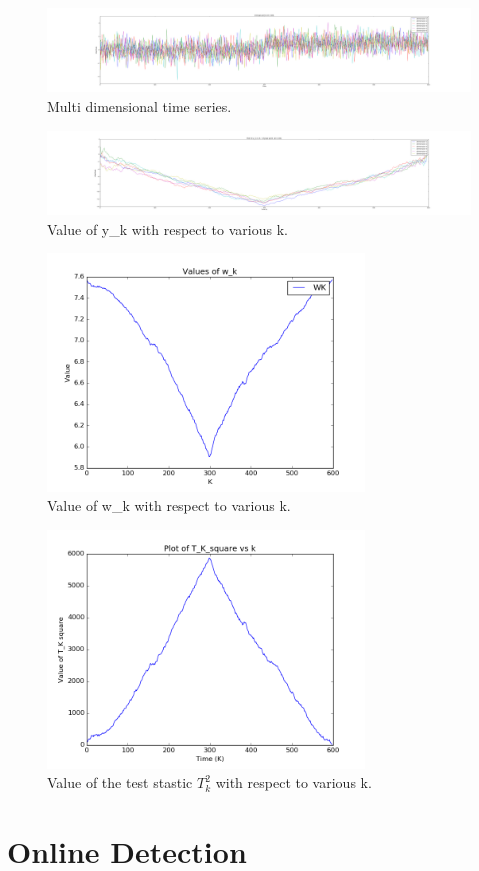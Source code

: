 \documentclass{article}
\begin{document}
\begin{figure}[ht!]
  \centering
  \includegraphics[width=1\textwidth]{images/rd_offline/ts}
  \caption{Multi dimensional time series.\label{fig:rd_ts}}
\end{figure}

\begin{figure}[ht!]
  \centering
  \includegraphics[width=1\textwidth]{images/rd_offline/y_k}
  \caption{Value of y\_k with respect to various k.\label{fig:rd_y_k}}
\end{figure}

\begin{figure}[ht!]
  \centering
  \includegraphics[width=0.75\textwidth]{images/rd_offline/w_k}
  \caption{Value of w\_k with respect to various k.\label{fig:rd_w_k}}
\end{figure}

\begin{figure}[ht!]
  \centering
  \includegraphics[width=0.75\textwidth]{images/rd_offline/tk_sq}
  \caption{Value of the test stastic $ T_{k}^{2} $ with respect to various k.\label{fig:rd_tk_sq}}
\end{figure}

\section{Online Detection}



\end{document}
